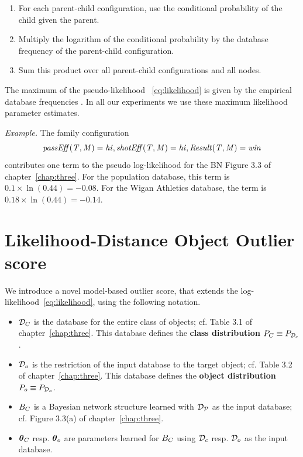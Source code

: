 				\begin{enumerate}
					\item For each parent-child configuration, 
					use the conditional probability of the child given the parent.
					\item Multiply the logarithm of the conditional probability by the database frequency of the parent-child configuration. 
					\item Sum this product over all parent-child configurations and all nodes. 
				\end{enumerate}
				
				
				The maximum of the pseudo-likelihood ~\eqref{eq:likelihood} is given by the empirical database frequencies \cite[Prop.3.1.]{Schulte2011}. In all our experiments we use these maximum likelihood parameter estimates.
				
				{\em Example.} The family configuration \begin{displaymath} \it{passEff(T,M)=hi}, shotEff(T,M)=hi, Result(T,M)=win\end{displaymath} contributes one term to the pseudo log-likelihood for the BN Figure 3.3 of chapter~\ref{chap:three}. For the population database, this term is $0.1 \times \ln(0.44) =-0.08 $. For the  Wigan Athletics database, the term is $0.18 \times \ln(0.44) =-0.14 $. 

	\section{Likelihood-Distance Object Outlier score} \label{sec:metrics}
	
	We introduce a novel model-based outlier score, that extends the log-likelihood~\eqref{eq:likelihood}, using the following notation.
	\begin{itemize}
		\item $\mathcal{D}_{C}$ is the database for the entire class of objects; cf. Table 3.1 of chapter~\ref{chap:three}. This database defines the \textbf{class distribution} $P_{C} \equiv P_{\mathcal{D}_{c}}$.
		\item $\mathcal{D}_{o}$ is the restriction of the input database to the target object; cf. Table 3.2 of chapter~\ref{chap:three}. This database defines the \textbf{object distribution} $P_{o} \equiv P_{\mathcal{D}_{o}}$.
		\item $B_{C}$ is a Bayesian network structure learned with $\mathcal{D}_{\mathcal{P}}$ as the input database; cf. Figure 3.3(a) of chapter~\ref{chap:three}.
		\item $\boldsymbol{\theta}_{C}$ resp. $\boldsymbol{\theta}_{o}$ are parameters learned for $B_{C}$ using $\mathcal{D}_{c}$ resp. $\mathcal{D}_{o}$ as the input database.
	\end{itemize}
	
